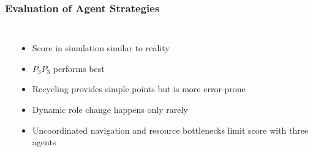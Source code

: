 \documentclass[]{beamer}
\begin{document}
\begin{frame}
  \frametitle{Evaluation of Agent Strategies} %
  \begin{columns}
    \center
    \\
    \\
    \raggedright
    \begin{itemize}
    \item Score in simulation similar to reality %
      \pause
    \item $P_3P_3$ performs best %
      \pause
    \item Recycling provides simple points but is more error-prone
      \pause
    \item Dynamic role change happens only rarely
      \pause
    \item Uncoordinated navigation and resource bottlenecks limit score with three agents
    \end{itemize}
  \end{columns}
\end{frame}
\end{document}
